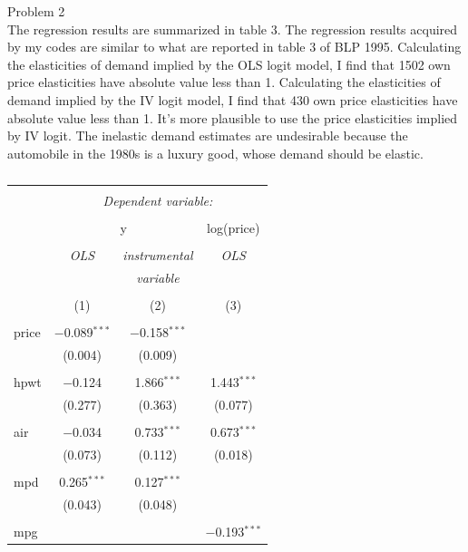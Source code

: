 \documentclass[12pt]{article}
\begin{document}
\noindent Problem 2\\
\noindent The regression results are summarized in table 3. The regression results acquired by my codes are similar to what are reported in table 3 of BLP 1995. Calculating the elasticities of demand implied by the OLS logit model, I find that 1502 own price elasticities have absolute value less than 1.  Calculating the elasticities of demand implied by the IV logit model, I find that 430 own price elasticities have absolute value less than 1. It's more plausible to use the price elasticities implied by IV logit. The inelastic demand estimates are undesirable because the automobile in the 1980s is a luxury good, whose demand should be elastic. 

\begin{table}[!htbp] \centering 
  \caption{} 
  \label{} 
\begin{tabular}{@{\extracolsep{5pt}}lccc} 
\\[-1.8ex]\hline 
\hline \\[-1.8ex] 
 & \multicolumn{3}{c}{\textit{Dependent variable:}} \\ 
\cline{2-4} 
\\[-1.8ex] & \multicolumn{2}{c}{y} & log(price) \\ 
\\[-1.8ex] & \textit{OLS} & \textit{instrumental} & \textit{OLS} \\ 
 & \textit{} & \textit{variable} & \textit{} \\ 
\\[-1.8ex] & (1) & (2) & (3)\\ 
\hline \\[-1.8ex] 
 price & $-$0.089$^{***}$ & $-$0.158$^{***}$ &  \\ 
  & (0.004) & (0.009) &  \\ 
  & & & \\ 
 hpwt & $-$0.124 & 1.866$^{***}$ & 1.443$^{***}$ \\ 
  & (0.277) & (0.363) & (0.077) \\ 
  & & & \\ 
 air & $-$0.034 & 0.733$^{***}$ & 0.673$^{***}$ \\ 
  & (0.073) & (0.112) & (0.018) \\ 
  & & & \\ 
 mpd & 0.265$^{***}$ & 0.127$^{***}$ &  \\ 
  & (0.043) & (0.048) &  \\ 
  & & & \\ 
 mpg &  &  & $-$0.193$^{***}$ \\ 

\end{tabular}
\end{table}
\end{document}
